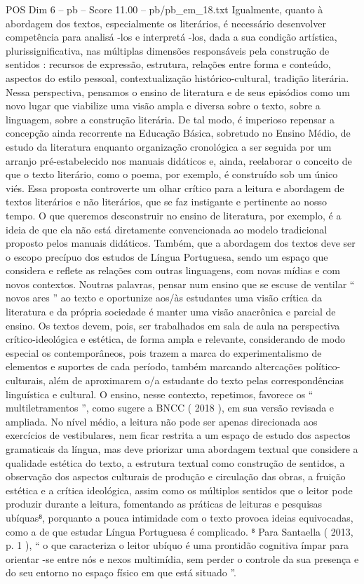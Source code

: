 \begin{textsample}{POS Dim 6 – pb – Score 11.00 – pb/pb\_em\_18.txt}
Igualmente, quanto à abordagem dos textos, especialmente os literários, é necessário desenvolver competência para analisá -los e interpretá -los, dada a sua condição artística, plurissignificativa, nas múltiplas dimensões responsáveis pela construção de sentidos : recursos de expressão, estrutura, relações entre forma e conteúdo, aspectos do estilo pessoal, contextualização histórico-cultural, tradição literária.
Nessa perspectiva, pensamos o ensino de literatura e de seus episódios como um novo lugar que viabilize uma visão ampla e diversa sobre o texto, sobre a linguagem, sobre a construção literária.
De tal modo, é imperioso repensar a concepção ainda recorrente na Educação Básica, sobretudo no Ensino Médio, de estudo da literatura enquanto organização cronológica a ser seguida por um arranjo pré-estabelecido nos manuais didáticos e, ainda, reelaborar o conceito de que o texto literário, como o poema, por exemplo, é construído sob um único viés.
Essa proposta controverte um olhar crítico para a leitura e abordagem de textos literários e não literários, que se faz instigante e pertinente ao nosso tempo.
O que queremos desconstruir no ensino de literatura, por exemplo, é a ideia de que ela não está diretamente convencionada ao modelo tradicional proposto pelos manuais didáticos.
Também, que a abordagem dos textos deve ser o escopo precípuo dos estudos de Língua Portuguesa, sendo um espaço que considera e reflete as relações com outras linguagens, com novas mídias e com novos contextos.
Noutras palavras, pensar num ensino que se escuse de ventilar “ novos ares ” ao texto e oportunize aos/às estudantes uma visão crítica da literatura e da própria sociedade é manter uma visão anacrônica e parcial de ensino.
Os textos devem, pois, ser trabalhados em sala de aula na perspectiva crítico-ideológica e estética, de forma ampla e relevante, considerando de modo especial os contemporâneos, pois trazem a marca do experimentalismo de elementos e suportes de cada período, também marcando altercações político-culturais, além de aproximarem o/a estudante do texto pelas correspondências linguística e cultural.
O ensino, nesse contexto, repetimos, favorece os “ multiletramentos ”, como sugere a BNCC ( 2018 ), em sua versão revisada e ampliada.
No nível médio, a leitura não pode ser apenas direcionada aos exercícios de vestibulares, nem ficar restrita a um espaço de estudo dos aspectos gramaticais da língua, mas deve priorizar uma abordagem textual que considere a qualidade estética do texto, a estrutura textual como construção de sentidos, a observação dos aspectos culturais de produção e circulação das obras, a fruição estética e a crítica ideológica, assim como os múltiplos sentidos que o leitor pode produzir durante a leitura, fomentando as práticas de leituras e pesquisas ubíquas⁸, porquanto a pouca intimidade com o texto provoca ideias equivocadas, como a de que estudar Língua Portuguesa é complicado. ⁸ Para Santaella ( 2013, p. 1 ), “ o que caracteriza o leitor ubíquo é uma prontidão cognitiva ímpar para orientar -se entre nós e nexos multimídia, sem perder o controle da sua presença e do seu entorno no espaço físico em que está situado ”.

\end{textsample}
